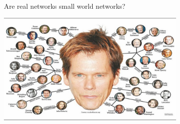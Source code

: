 \documentclass[aspectratio=169]{beamer}
\begin{document}
\begin{frame}
\frametitle{}

Are real networks small world networks?

\begin{center}
\includegraphics[width = 0.7\textwidth]{figures/degrees_of_bacon}
\end{center}

\end{frame}
\end{document}
